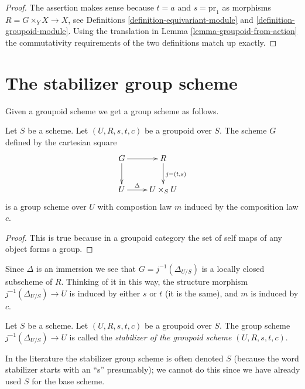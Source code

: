\begin{proof}
The assertion makes sense because $t = a$ and $s = \text{pr}_1$
as morphisms $R = G \times_Y X \to X$, see
Definitions \ref{definition-equivariant-module} and
\ref{definition-groupoid-module}.
Using the translation in Lemma \ref{lemma-groupoid-from-action}
the commutativity requirements
of the two definitions match up exactly.
\end{proof}





\section{The stabilizer group scheme}
\label{section-stabilizer}

\noindent
Given a groupoid scheme we get a group scheme as follows.

\begin{lemma}
\label{lemma-groupoid-stabilizer}
Let $S$ be a scheme.
Let $(U, R, s, t, c)$ be a groupoid over $S$.
The scheme $G$ defined by the cartesian square
$$
\xymatrix{
G \ar[r] \ar[d] & R \ar[d]^{j = (t, s)} \\
U \ar[r]^-{\Delta} & U \times_S U
}
$$
is a group scheme over $U$ with compostion law
$m$ induced by the composition law $c$.
\end{lemma}

\begin{proof}
This is true because in a groupoid category the
set of self maps of any object forms a group.
\end{proof}

\noindent
Since $\Delta$ is an immersion we see that $G = j^{-1}(\Delta_{U/S})$
is a locally closed subscheme of $R$. Thinking of it in this way,
the structure morphism $j^{-1}(\Delta_{U/S}) \to U$ is induced by
either $s$ or $t$ (it is the same), and $m$ is induced by $c$.

\begin{definition}
\label{definition-stabilizer-groupoid}
Let $S$ be a scheme.
Let $(U, R, s, t, c)$ be a groupoid over $S$.
The group scheme $j^{-1}(\Delta_{U/S})\to U$
is called the {\it stabilizer of the groupoid scheme
$(U, R, s, t, c)$}.
\end{definition}

\noindent
In the literature the stabilizer group scheme is often denoted $S$
(because the word stabilizer starts with an ``s'' presumably);
we cannot do this since we have already used $S$ for the base scheme.

